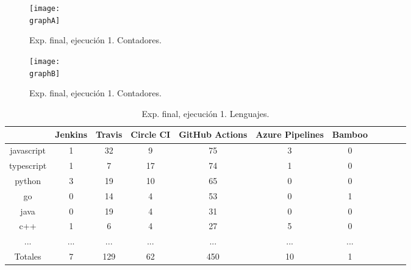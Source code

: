 \begin{figure}
  \centering
  \texttt{[image: \\graphA]}
  \caption{Exp. final, ejecución 1. Contadores.}
\end{figure}

\begin{figure}
  \centering
  \texttt{[image: \\graphB]}
  \caption{Exp. final, ejecución 1. Contadores.}
\end{figure}

\begin{table}
  \centering
  \caption{Exp. final, ejecución 1. Lenguajes.}
  \label{tab:tabla_f1_2a}

\begin{footnotesize}
\renewcommand{\arraystretch}{1.5} %
\begin{tabular}{ccccccccccc}
  \hline
  {} &  Jenkins &  Travis &  Circle CI &  GitHub Actions &  Azure Pipelines &  Bamboo \\
  \hline
  javascript       &        1 &      32 &          9 &              75 &                3 &       0 \\
  typescript       &        1 &       7 &         17 &              74 &                1 &       0 \\
  python           &        3 &      19 &         10 &              65 &                0 &       0 \\
  go               &        0 &      14 &          4 &              53 &                0 &       1 \\
  java             &        0 &      19 &          4 &              31 &                0 &       0 \\
  c++              &        1 &       6 &          4 &              27 &                5 &       0 \\
  ...              &      ... &     ... &        ... &             ... &              ... &     ... \\
  \hline
  Totales          &        7 &     129 &         62 &             450 &               10 &       1 \\
 \end{tabular}
\end{footnotesize}

\end{table}

